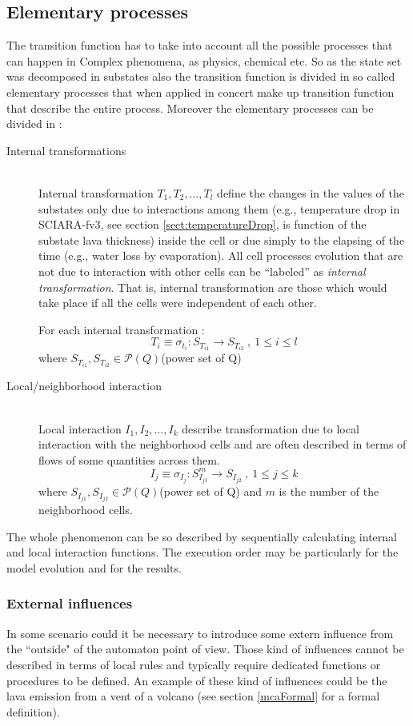 \subsection{Elementary processes}\label{elementaryProcesses}
The transition function has to take into account all the possible processes that
can happen in  Complex phenomena, as physics, chemical etc. So as the state
set was decomposed in substates also the transition function is divided in so
called elementary processes that when applied in concert make up 
transition function that describe the entire process.
Moreover the elementary processes can be divided in :
\begin{description}
  \item[Internal transformations] \hfill \\
  Internal transformation \(T_1,T_2,\ldots,T_l\) define the changes in the
  values of the substates only due to interactions among them (e.g., temperature
  drop in SCIARA-fv3, see section \ref{sect:temperatureDrop}, is function of
  the substate lava thickness) inside the cell or due simply to the elapsing of
  the time (e.g., water loss by evaporation). All cell processes evolution that
  are not due to interaction with other cells can be ``labeled'' as
  \emph{internal transformation}. That is, internal transformation are those
  which would take place if all the cells were independent of each other.

For each internal transformation :
\[ 
  T_i \equiv \sigma_{t_i} \colon  S_{T_{i1}}\rightarrow S_{T_{i2}} \:,\: 1 \leq
  i \leq l
\] 
  where $S_{T_{i1}},S_{T_{i2}} \in \mathcal{P}(Q) $(power
  set of Q) 
  \item[Local/neighborhood interaction] \hfill \\
  Local interaction \(I_1,I_2,\ldots,I_k\) describe transformation due to local
  interaction with the neighborhood cells and are often described in terms of
  flows of some quantities across them.
\[
  I_j \equiv \sigma_{I_j} \colon  S^m_{I_{j1}} \rightarrow S_{I_{j2}} \:,\:
  1 \leq j \leq k
\] 
  where $S_{I_{j1}},S_{I_{j2}} \in \mathcal{P}(Q) $(power
  set of Q) and \(m\) is the number of the neighborhood cells.
\end{description}

The whole phenomenon can be so described by sequentially calculating internal
and local interaction functions. The execution order may be
particularly  for the model evolution and for the results\cite{Ruxton1996}.

\subsubsection{External influences}
In some scenario could it be necessary to introduce some extern influence
from the ``outside" of the automaton point of view. Those kind of influences
cannot be described in terms of local rules and typically require dedicated
functions or procedures to be defined. An example of these kind of influences
could be the lava emission from a vent of a volcano (see section \ref{mcaFormal}
for a formal definition).

